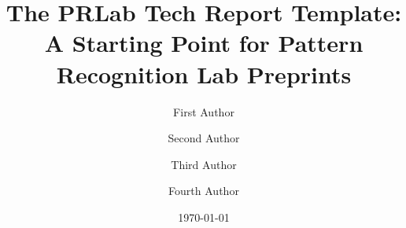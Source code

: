 \documentclass[]{prlab}
\title{The PRLab Tech Report Template: A Starting Point for Pattern Recognition Lab Preprints}
\author[1,\star]{First Author}
\author[1,\star]{Second Author}
\author[1]{Third Author}
\author[2,\dagger]{Fourth Author}
\affiliation[1]{Pattern Recognition Laboratory, Nanjing University}
\affiliation[2]{Collaborating Institution}
\date{\today}
\begin{document}
\maketitle






\clearpage



\clearpage
\beginappendix

\end{document}
